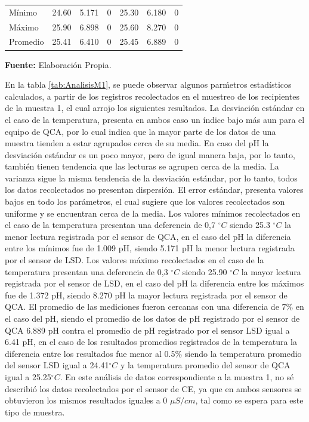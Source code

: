 \begin{table}[H]
\begin{tabular}{l ccc|ccc}
Mínimo  &   \multicolumn{1}{c}{24.60}  & \multicolumn{1}{r}{5.171} & 0 & \multicolumn{1}{c}{25.30} & \multicolumn{1}{r}{6.180} & 0 \\
Máximo  & \multicolumn{1}{c}{25.90}    & \multicolumn{1}{c}{6.898} & 0 & \multicolumn{1}{c}{25.60}  & \multicolumn{1}{c}{8.270} & 0  \\ 
Promedio & \multicolumn{1}{c}{25.41}   & \multicolumn{1}{c}{6.410} & 0 & \multicolumn{1}{c}{25.45} & \multicolumn{1}{c}{6.889} & 0 
\\ 
\hline
\end{tabular}
\vspace{5mm}
\newline
\hfill \textbf{Fuente: }Elaboración Propia.
\end{table}

En la tabla \ref{tab:AnalisisM1}, se puede observar algunos par\'metros estad\'isticos calculados, a partir de los registros recolectados en el muestreo de los recipientes de la muestra 1, el cual arrojo los siguientes resultados. La desviaci\'on est\'andar en el caso de la temperatura, presenta en ambos caso un \'indice bajo m\'as aun para el equipo de QCA, por lo cual indica que la mayor parte de los datos de una muestra tienden a estar agrupados cerca de su media. En caso del pH la desviaci\'on est\'andar es un poco mayor, pero de igual manera baja, por lo tanto, tambi\'en tienen tendencia que las lecturas se agrupen cerca de la media. La varianza sigue la misma tendencia de la desviaci\'on est\'andar, por lo tanto, todos los datos recolectados no presentan dispersi\'on. El error est\'andar, presenta valores bajos en todo los par\'ametros, el cual sugiere que los valores recolectados son uniforme y se encuentran cerca de la media. Los valores mínimos recolectados en el caso de la temperatura presentan una deferencia de 0,7 $ ^{\circ}C$ siendo 25.3 $ ^{\circ}C$ la menor lectura registrada por el sensor de QCA, en el caso del pH la diferencia entre los mínimos fue de 1.009 pH, siendo 5.171 pH la menor lectura registrada por el sensor de LSD. Los valores m\'aximo recolectados en el caso de la temperatura presentan una deferencia de 0,3 $ ^{\circ}C$ siendo 25.90 $ ^{\circ}C$ la mayor lectura registrada por el sensor de LSD, en el caso del pH la diferencia entre los m\'aximos fue de 1.372 pH, siendo 8.270 pH la mayor lectura registrada por el sensor de QCA. El promedio de las mediciones fueron cercanas con una diferencia de 7$\%$ en el caso del pH, siendo el promedio de los datos de pH registrado por el sensor de QCA 6.889 pH contra el promedio de pH registrado por el sensor LSD igual a 6.41 pH, en el caso de los resultados promedios registrados de la temperatura la diferencia entre los resultados fue menor al 0.5$\%$ siendo la temperatura promedio del sensor LSD igual a 24.41$ ^{\circ}C$ y la temperatura promedio del sensor de QCA igual a 25.25$^{\circ}C$. En este an\'alisis de datos correspondiente a la muestra 1, no sé describi\'o los datos recolectados por el sensor de CE, ya que en ambos sensores se obtuvieron los mismos resultados iguales a 0 $\mu S/cm$, tal como se espera para este tipo de muestra.

